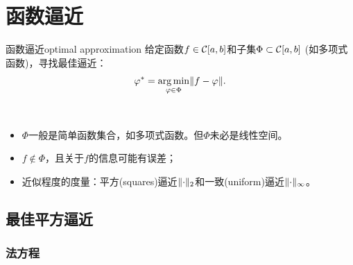 \chapter{函数逼近}
\label{chap:optimal approximation}

\begin{definition}
    {函数逼近}{optimal approximation}
    给定函数$f \in \mathcal{C}[a,b]$和子集$\Phi \subset \mathcal{C}[a,b]$ (如多项式函数)，寻找最佳逼近：
    \begin{equation}
        \varphi^* = \operatorname*{arg\,min}_{\varphi\in\Phi}\lVert f - \varphi\rVert.
    \end{equation}
\end{definition}

\begin{remark}
    ~
    \begin{itemize}
        \item $\Phi$一般是简单函数集合，如多项式函数。但$\Phi$未必是线性空间。
        \item $f \notin \Phi$，且关于$f$的信息可能有误差；
        \item 近似程度的度量：平方(squares)逼近$\lVert\cdot\rVert_2$和一致(uniform)逼近$\lVert\cdot\rVert_\infty$。
    \end{itemize}
\end{remark}

\section{最佳平方逼近}
\label{sec:optimal squares approximation}

\subsection{法方程}

